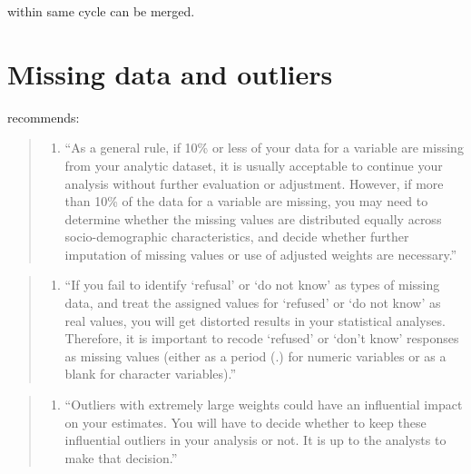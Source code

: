 \documentclass[
]{book}
\providecommand{\tightlist}{%
  \setlength{\itemsep}{0pt}\setlength{\parskip}{0pt}}
\begin{document}
within same cycle can be merged.

\hypertarget{missing-data-and-outliers}{%
\section{Missing data and outliers}\label{missing-data-and-outliers}}

\citet{CDCfaq} recommends:

\begin{quote}
\begin{enumerate}
\def\labelenumi{\arabic{enumi}.}
\tightlist
\item
  ``As a general rule, if 10\% or less of your data for a variable are missing from your analytic dataset, it is usually acceptable to continue your analysis without further evaluation or adjustment. However, if more than 10\% of the data for a variable are missing, you may need to determine whether the missing values are distributed equally across socio-demographic characteristics, and decide whether further imputation of missing values or use of adjusted weights are necessary.''
\end{enumerate}
\end{quote}

\begin{quote}
\begin{enumerate}
\def\labelenumi{\arabic{enumi}.}
\setcounter{enumi}{1}
\tightlist
\item
  ``If you fail to identify `refusal' or `do not know' as types of missing data, and treat the assigned values for `refused' or `do not know' as real values, you will get distorted results in your statistical analyses. Therefore, it is important to recode `refused' or `don't know' responses as missing values (either as a period (.) for numeric variables or as a blank for character variables).''
\end{enumerate}
\end{quote}

\begin{quote}
\begin{enumerate}
\def\labelenumi{\arabic{enumi}.}
\setcounter{enumi}{2}
\tightlist
\item
  ``Outliers with extremely large weights could have an influential impact on your estimates. You will have to decide whether to keep these influential outliers in your analysis or not. It is up to the analysts to make that decision.''
\end{enumerate}
\end{quote}
\end{document}
